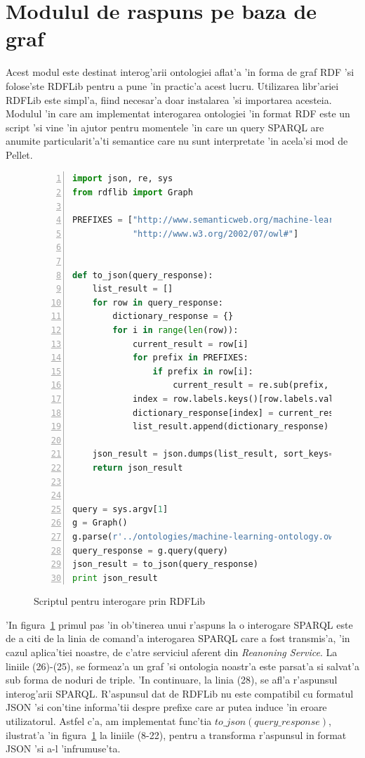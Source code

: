 \documentclass[12pt,a4paper,twoside]{report}
\begin{document}
\section{Modulul de raspuns pe baza de graf}

Acest modul este destinat interog'arii ontologiei aflat'a 'in forma de graf RDF 'si folose'ste RDFLib pentru a pune 'in practic'a acest lucru. Utilizarea libr'ariei RDFLib este simpl'a, fiind necesar'a doar instalarea 'si importarea acesteia. Modulul 'in care am implementat interogarea ontologiei 'in format RDF este un script 'si vine 'in ajutor pentru momentele 'in care un query SPARQL are anumite particularit'a'ti semantice care nu sunt interpretate 'in acela'si mod de Pellet. 

\begin{figure}
\centering
\begin{lstlisting}[language=Python, basicstyle=\footnotesize,numbers=left, xleftmargin=.05\textwidth]
import json, re, sys
from rdflib import Graph

PREFIXES = ["http://www.semanticweb.org/machine-learning-ontology#",  
            "http://www.w3.org/2002/07/owl#"]


def to_json(query_response):
    list_result = []
    for row in query_response:
        dictionary_response = {}
        for i in range(len(row)):
            current_result = row[i]
            for prefix in PREFIXES:
                if prefix in row[i]:
                    current_result = re.sub(prefix, "", row[i])
            index = row.labels.keys()[row.labels.values().index(i)]
            dictionary_response[index] = current_result
            list_result.append(dictionary_response)

    json_result = json.dumps(list_result, sort_keys=False, indent=4)
    return json_result


query = sys.argv[1]
g = Graph()
g.parse(r'../ontologies/machine-learning-ontology.owl', format="xml")
query_response = g.query(query)
json_result = to_json(query_response)
print json_result

\end{lstlisting}
        \caption{Scriptul pentru interogare prin RDFLib}
      \label{fig:rdflib_script}
\end{figure}

'In figura~\ref{fig:rdflib_script} primul pas 'in ob'tinerea unui r'aspuns la o interogare SPARQL este de a citi de la linia de comand'a interogarea SPARQL care a fost transmis'a, 'in cazul aplica'tiei noastre, de c'atre serviciul aferent din {\it Reanoning Service}. La liniile (26)-(25), se formeaz'a un graf 'si ontologia noastr'a este parsat'a si salvat'a sub forma de noduri de triple. 'In continuare, la linia (28), se afl'a r'aspunsul interog'arii SPARQL. R'aspunsul dat de RDFLib nu este compatibil cu formatul JSON 'si con'tine informa'tii despre prefixe care ar putea induce 'in eroare utilizatorul. Astfel c'a, am implementat func'tia $to\_json(query\_response)$, ilustrat'a 'in figura~\ref{fig:rdflib_script} la liniile (8-22), pentru a transforma r'aspunsul in format JSON 'si a-l 'infrumuse'ta. 
\end{document}
